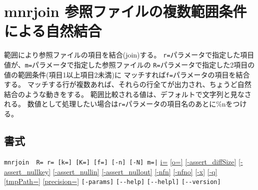 
%

\section{mnrjoin 参照ファイルの複数範囲条件による自然結合\label{sect:mnrjoin}}
範囲により参照ファイルの項目を結合(join)する。
\verb|r=|パラメータで指定した項目値が、\verb|m=|パラメータで指定した参照ファイルの
\verb|R=|パラメータで指定した2項目の値の範囲条件(項目1以上項目2未満)に
マッチすれば\verb|f=|パラメータの項目を結合する。
マッチする行が複数あれば、それらの行全てが出力され、ちょうど自然結合のような動きをする。
範囲比較される値は、デフォルトで文字列と見なされる。
数値として処理したい場合は\verb|r=|パラメータの項目名のあとに\%nをつける。

\subsection*{書式}
\verb/mnrjoin  R= r= [k=] [K=] [f=] [-n] [-N] m=|/ 
\hyperref[sect:option_i]{i=}
\hyperref[sect:option_o]{[o=]}
\hyperref[sect:option_assert_diffSize]{[-assert\_diffSize]}
\hyperref[sect:option_assert_nullkey]{[-assert\_nullkey]}
\hyperref[sect:option_assert_nullin]{[-assert\_nullin]}
\hyperref[sect:option_assert_nullout]{[-assert\_nullout]}
\hyperref[sect:option_nfn]{[-nfn]} 
\hyperref[sect:option_nfno]{[-nfno]}  
\hyperref[sect:option_x]{[-x]}
\hyperref[sect:option_q]{[-q]}
\hyperref[sect:option_option_tmppath]{[tmpPath=]}
\hyperref[sect:option_precision]{[precision=]}
\verb|[-params]|
\verb|[--help]|
\verb|[--helpl]|
\verb|[--version]|\\

